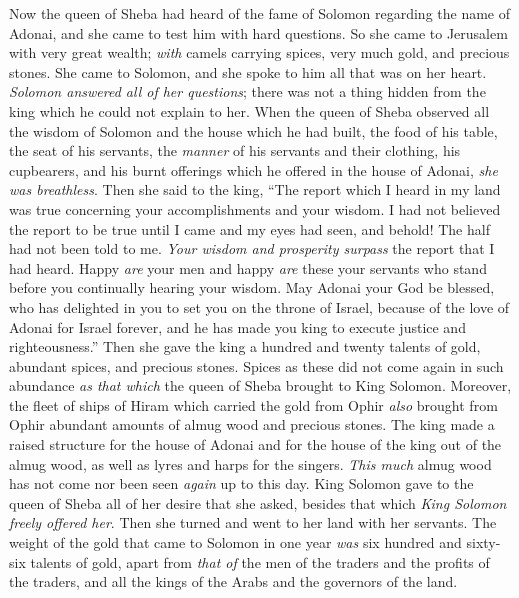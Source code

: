\begin{biblechapter} %
 Now the queen of Sheba had heard of the fame of Solomon regarding the name of Adonai, and she came to test him with hard questions.
\verse So she came to Jerusalem with very great wealth; \textit{with} camels carrying spices, very much gold, and precious stones. She came to Solomon, and she spoke to him all that was on her heart.
\verse \textit{Solomon answered all of her questions}; there was not a thing hidden from the king which he could not explain to her.
\verse When the queen of Sheba observed all the wisdom of Solomon and the house which he had built,
\verse the food of his table, the seat of his servants, the \textit{manner} of his servants and their clothing, his cupbearers, and his burnt offerings which he offered in the house of Adonai, \textit{she was breathless}.
\verse Then she said to the king, “The report which I heard in my land was true concerning your accomplishments and your wisdom.
\verse I had not believed the report to be true until I came and my eyes had seen, and behold! The half had not been told to me. \textit{Your wisdom and prosperity surpass} the report that I had heard.
\verse Happy \textit{are} your men and happy \textit{are} these your servants who stand before you continually hearing your wisdom.
\verse May Adonai your God be blessed, who has delighted in you to set you on the throne of Israel, because of the love of Adonai for Israel forever, and he has made you king to execute justice and righteousness.”
\verse Then she gave the king a hundred and twenty talents of gold, abundant spices, and precious stones. Spices as these did not come again in such abundance \textit{as that which} the queen of Sheba brought to King Solomon.
\verse Moreover, the fleet of ships of Hiram which carried the gold from Ophir \textit{also} brought from Ophir abundant amounts of almug wood and precious stones.
\verse The king made a raised structure for the house of Adonai and for the house of the king out of the almug wood, as well as lyres and harps for the singers. \textit{This much} almug wood has not come nor been seen \textit{again} up to this day.
\verse King Solomon gave to the queen of Sheba all of her desire that she asked, besides that which \textit{King Solomon freely offered her}. Then she turned and went to her land with her servants.
\verse The weight of the gold that came to Solomon in one year \textit{was} six hundred and sixty-six talents of gold,
\verse apart from \textit{that of} the men of the traders and the profits of the traders, and all the kings of the Arabs and the governors of the land.

\end{biblechapter}
